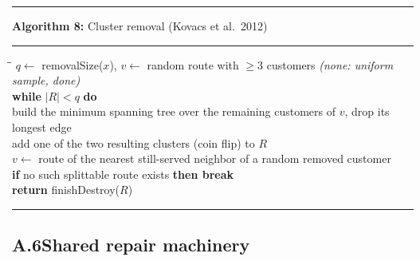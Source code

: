 \documentclass[10pt, a4paper]{article}
\begin{document}
\begin{center}
\begin{minipage}{0.92\linewidth}
\small
\hrule\vspace{2pt}
\textbf{Algorithm 8:} Cluster removal (Kovacs et al.\ 2012)
\vspace{2pt}\hrule\vspace{4pt}
\begin{tabbing}
\hspace{1.2em}\=\hspace{1.2em}\=\kill
$q \leftarrow$ removalSize($x$),\quad
$v \leftarrow$ random route with $\ge 3$ customers
\quad\emph{(none: uniform sample, done)}\\
\textbf{while} $|R| < q$ \textbf{do}\\
\>build the minimum spanning tree over the remaining customers of $v$,
  drop its longest edge\\
\>add one of the two resulting clusters (coin flip) to $R$\\
\>$v \leftarrow$ route of the nearest still-served neighbor of a random
  removed customer\\
\>\textbf{if} no such splittable route exists \textbf{then break}\\
\textbf{return} finishDestroy($R$)
\end{tabbing}
\vspace{2pt}\hrule
\end{minipage}
\end{center}

\subsection*{A.6\quad Shared repair machinery}
\end{document}
